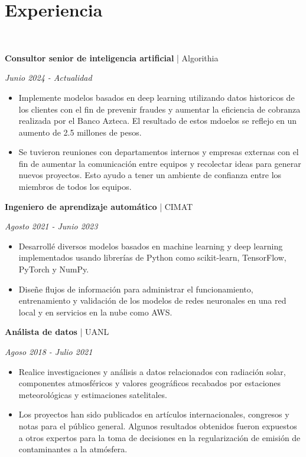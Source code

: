 \documentclass[a3paper]{adcv_color}
\newcommand{\work}[3]{
	\begin{minipage}{0.75\linewidth}
		\textbf{#1} | #2
	\end{minipage}
	\begin{minipage}{0.25\linewidth}
		\begin{flushright}
			\textit{#3}
		\end{flushright}
	\end{minipage}
	\vspace{-1cm}
}
\begin{document}
\section{Experiencia}\\
\begin{addmargin}[0.5em]{0.5em}
	\work{Consultor senior de inteligencia artificial}{Algorithia}{Junio 2024 - Actualidad}
	\begin{itemize}
		\item Implemente modelos basados en deep learning utilizando datos historicos de los clientes con el fin de prevenir fraudes y aumentar la eficiencia de cobranza realizada por el Banco Azteca. El resultado de estos mdoelos se reflejo en un aumento de 2.5 millones de pesos.
		\item Se tuvieron reuniones con departamentos internos y empresas externas con el fin de aumentar la comunicación entre equipos y recolectar ideas para generar nuevos proyectos. Esto ayudo a tener un ambiente de confianza entre los miembros de todos los equipos.
	\end{itemize}
	\work{Ingeniero de aprendizaje automático}{CIMAT}{Agosto 2021 - Junio 2023}
	\begin{itemize}
		\item Desarrollé diversos modelos basados en machine learning y deep learning implementados usando librerías de Python como scikit-learn, TensorFlow, PyTorch y NumPy.
		\item Diseñe flujos de información para administrar el funcionamiento, entrenamiento y validación de los modelos de redes neuronales en una red local y en servicios en la nube como AWS.
	\end{itemize}
	\work{Análista de datos}{UANL}{Agoso 2018 - Julio 2021}
	\begin{itemize}
		\item Realice investigaciones y análisis a datos relacionados con radiación solar, componentes atmosféricos y valores geográficos recabados por estaciones meteorológicas y estimaciones satelitales.
		\item Los proyectos han sido publicados en artículos internacionales, congresos y notas para el público general. Algunos resultados obtenidos fueron expuestos a otros expertos para la toma de decisiones en la regularización de emisión de contaminantes a la atmósfera.
	\end{itemize}
\end{addmargin}
\end{document}
